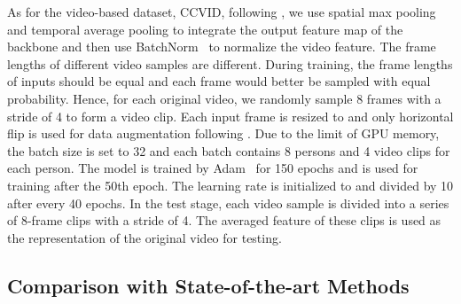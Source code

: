 \documentclass[10pt,twocolumn,letterpaper]{article}
\begin{document}
As for the video-based dataset, \ie CCVID, following \cite{Gu2020AP3D}, we use spatial max pooling and temporal average pooling to integrate the output feature map of the backbone and then use BatchNorm~\cite{Ioffe2015BN} to normalize the video feature.
The frame lengths of different video samples are different.
During training, the frame lengths of inputs should be equal and each frame would better be sampled with equal probability. 
Hence, for each original video, we randomly sample 8 frames with a stride of 4 to form a video clip.
Each input frame is resized to  and only horizontal flip is used for data augmentation following \cite{Gu2020AP3D}.
Due to the limit of GPU memory, the batch size is set to 32 and each batch contains 8 persons and 4 video clips for each person.
The model is trained by Adam~\cite{Kingma2014Adam} for 150 epochs and  is used for training after the 50th epoch.
The learning rate is initialized to  and divided by 10 after every 40 epochs. 
In the test stage, each video sample is divided into a series of 8-frame clips with a stride of 4. The averaged feature of these clips is used as the representation of the original video for testing.

\subsection{Comparison with State-of-the-art Methods}
\end{document}
